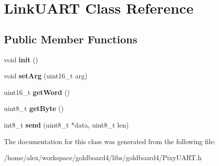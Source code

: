 \hypertarget{class_link_u_a_r_t}{}\section{Link\+U\+A\+RT Class Reference}
\label{class_link_u_a_r_t}
\subsection*{Public Member Functions}
\begin{DoxyCompactItemize}
\item 
void {\bfseries init} ()\hypertarget{class_link_u_a_r_t_a01a9c561421f4ddb04f329219eb2e100}{}\label{class_link_u_a_r_t_a01a9c561421f4ddb04f329219eb2e100}

\item 
void {\bfseries set\+Arg} (uint16\+\_\+t arg)\hypertarget{class_link_u_a_r_t_a26a7fe9330f846de273637517a0f092c}{}\label{class_link_u_a_r_t_a26a7fe9330f846de273637517a0f092c}

\item 
uint16\+\_\+t {\bfseries get\+Word} ()\hypertarget{class_link_u_a_r_t_af8d40edd838c32f455cd64a9399e1279}{}\label{class_link_u_a_r_t_af8d40edd838c32f455cd64a9399e1279}

\item 
uint8\+\_\+t {\bfseries get\+Byte} ()\hypertarget{class_link_u_a_r_t_aeead28b04db5dd81516af99125b74f30}{}\label{class_link_u_a_r_t_aeead28b04db5dd81516af99125b74f30}

\item 
int8\+\_\+t {\bfseries send} (uint8\+\_\+t $\ast$data, uint8\+\_\+t len)\hypertarget{class_link_u_a_r_t_ae39f94886b5656fcd391be7e3d26f6b5}{}\label{class_link_u_a_r_t_ae39f94886b5656fcd391be7e3d26f6b5}

\end{DoxyCompactItemize}


The documentation for this class was generated from the following file\+:\begin{DoxyCompactItemize}
\item 
/home/alex/workspace/goldboard4/libs/goldboard4/Pixy\+U\+A\+R\+T.\+h\end{DoxyCompactItemize}
